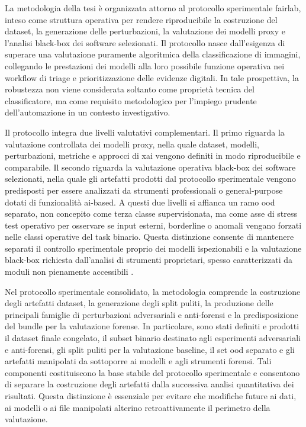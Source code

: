 La metodologia della tesi è organizzata attorno al protocollo sperimentale
\gls{fairlab}, inteso come struttura operativa per rendere riproducibile la
costruzione del dataset, la generazione delle perturbazioni, la valutazione dei
modelli proxy e l'analisi black-box dei software selezionati. Il protocollo nasce
dall'esigenza di superare una valutazione puramente algoritmica della
classificazione di immagini, collegando le prestazioni dei modelli alla loro
possibile funzione operativa nei workflow di triage e prioritizzazione delle
evidenze digitali. In tale prospettiva, la robustezza non viene considerata
soltanto come proprietà tecnica del classificatore, ma come requisito
metodologico per l'impiego prudente dell'automazione in un contesto
investigativo.

Il protocollo integra due livelli valutativi complementari. Il primo riguarda la
valutazione controllata dei modelli proxy, nella quale dataset, modelli,
perturbazioni, metriche e approcci di \gls{xai} vengono definiti in modo
riproducibile e comparabile. Il secondo riguarda la valutazione operativa
black-box dei software selezionati, nella quale gli artefatti prodotti dal
protocollo sperimentale vengono predisposti per essere analizzati da strumenti
professionali o general-purpose dotati di funzionalità \gls{ai}-based. A questi
due livelli si affianca un ramo \gls{ood} separato, non concepito come terza
classe supervisionata, ma come asse di stress test operativo per osservare se
input esterni, borderline o anomali vengano forzati nelle classi operative del
task binario. Questa distinzione consente di mantenere separati il controllo sperimentale proprio dei
modelli ispezionabili e la valutazione black-box richiesta dall'analisi di
strumenti proprietari, spesso caratterizzati da moduli non pienamente
accessibili \cite{sanna2024preliminary,sanna2025pixelperfect}.

Nel protocollo sperimentale consolidato, la metodologia comprende la costruzione
degli artefatti dataset, la generazione degli split puliti, la produzione delle
principali famiglie di perturbazioni adversariali e anti-forensi e la
predisposizione del bundle per la valutazione forense. In particolare, sono
stati definiti e prodotti il dataset finale congelato, il subset binario
destinato agli esperimenti adversariali e anti-forensi, gli split puliti per la
valutazione baseline, il set \gls{ood} separato e gli artefatti manipolati da
sottoporre ai modelli e agli strumenti forensi. Tali componenti costituiscono
la base stabile del protocollo sperimentale e consentono di separare la
costruzione degli artefatti dalla successiva analisi quantitativa dei risultati.
Questa distinzione è essenziale per evitare che modifiche future ai dati, ai
modelli o ai file manipolati alterino retroattivamente il perimetro della
valutazione.

